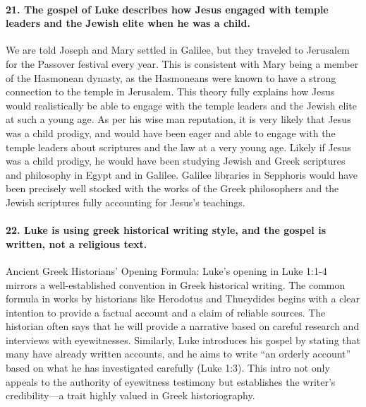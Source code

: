\paragraph{21.
The gospel of Luke describes how Jesus engaged with temple leaders and the Jewish elite when he was a child.}\label{par:the-gospel-of-luke-describes-how-jesus-engaged-with-temple-leaders-and-the-jewish-elite-when-he-was-a-child.}

We are told Joseph and Mary settled in Galilee, but they traveled to Jerusalem for the Passover festival every year.
This is consistent with Mary being a member of the Hasmonean dynasty, as the Hasmoneans were known to have a strong connection to the temple in Jerusalem.
This theory fully explains how Jesus would realistically be able to engage with the temple leaders and the Jewish elite at such a young age.
As per his wise man reputation, it is very likely that Jesus was a child prodigy, and would have been eager and able to engage with the temple leaders about scriptures and the law at a very young age.
Likely if Jesus was a child prodigy, he would have been studying Jewish and Greek scriptures and philosophy in Egypt and in Galilee.
Galilee libraries in Sepphoris would have been precisely well stocked with the works of the Greek philosophers and the Jewish scriptures fully accounting for Jesus's teachings.

\paragraph{22.
Luke is using greek historical writing style, and the gospel is written, not a religious text.}\label{par:luke-is-using-greek-historical-writing-style-and-the-gospel-is-written-not-a-religious-text.}

Ancient Greek Historians' Opening Formula: Luke's opening in Luke 1:1-4 mirrors a well-established convention in Greek historical writing.
The common formula in works by historians like Herodotus and Thucydides begins with a clear intention to provide a factual account and a claim of reliable sources.
The historian often says that he will provide a narrative based on careful research and interviews with eyewitnesses.
Similarly, Luke introduces his gospel by stating that many have already written accounts, and he aims to write ``an orderly account'' based on what he has investigated carefully (Luke 1:3).
This intro not only appeals to the authority of eyewitness testimony but establishes the writer's credibility---a trait highly valued in Greek historiography.

